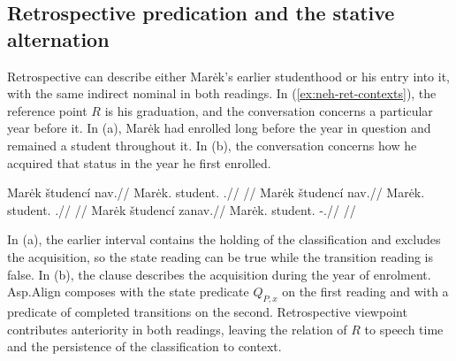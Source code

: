 \subsection{Retrospective predication and the stative alternation}%
\label{sec:neh-past}

Retrospective  can describe either Marėk's earlier studenthood
or his entry into it, with the same indirect nominal in both readings.
In (\ref{ex:neh-ret-contexts}), the reference point $R$ is his
graduation, and the conversation concerns a particular year before
it. In (a), Marėk had enrolled long before the year in question and
remained a student throughout it. In (b), the conversation concerns
how he acquired that status in the year he first enrolled.

\pex\label{ex:neh-ret-contexts}
\a
\begingl
\gla Marėk študencí nav.//
\glb Marėk.\Dir{} student.\Ind{} \Cop{}.\Ret{}//
\glft {}
//
\endgl
\a
\begingl
\gla Marėk študencí nav.//
\glb Marėk.\Dir{} student.\Ind{} \Cop{}.\Ret{}//
\glft {}
//
\endgl
\a
\begingl
\gla Marėk študencí zanav.//
\glb Marėk.\Dir{} student.\Ind{} \Neg{}-\Cop{}.\Ret{}//
\glft {}
//
\endgl
\xe

\noindent In (a), the earlier interval contains the holding of the
classification and excludes the acquisition, so the state reading
can be true while the transition reading is false. In (b), the
clause describes the acquisition during the year of enrolment.
Asp.Align composes with the state predicate $Q_{P,x}$
on the first reading and with a predicate of completed transitions
on the second. Retrospective viewpoint contributes anteriority in
both readings, leaving the relation of $R$ to speech time and the
persistence of the classification to context.

